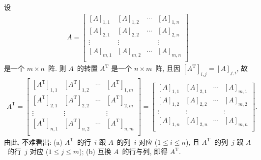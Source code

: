 \begin{example}
    设
    \begin{align*}
        A =
        \begin{bmatrix}
            [A]_{1,1} & [A]_{1,2} & \cdots & [A]_{1,n} \\
            [A]_{2,1} & [A]_{2,2} & \cdots & [A]_{2,n} \\
            \vdots    & \vdots    & {}     & \vdots    \\
            [A]_{m,1} & [A]_{m,2} & \cdots & [A]_{m,n} \\
        \end{bmatrix}
    \end{align*}
    是一个 \(m \times n\)~阵.
    则 \(A\)~的转置 \(A^{\mathrm{T}}\)
    是一个 \(n \times m\)~阵,
    且因 \([A^{\mathrm{T}}]_{i,j} = [A]_{j,i}\),
    故
    \begin{align*}
        A^{\mathrm{T}}
        =
        \begin{bmatrix}
            [A^{\mathrm{T}}]_{1,1} & [A^{\mathrm{T}}]_{1,2} &
            \cdots                 & [A^{\mathrm{T}}]_{1,m}   \\
            [A^{\mathrm{T}}]_{2,1} & [A^{\mathrm{T}}]_{2,2} &
            \cdots                 & [A^{\mathrm{T}}]_{2,m}   \\
            \vdots                 & \vdots                 &
            {}                     & \vdots                   \\
            [A^{\mathrm{T}}]_{n,1} & [A^{\mathrm{T}}]_{n,2} &
            \cdots                 & [A^{\mathrm{T}}]_{n,m}   \\
        \end{bmatrix}
        =
        \begin{bmatrix}
            [A]_{1,1} & [A]_{2,1} & \cdots & [A]_{m,1} \\
            [A]_{1,2} & [A]_{2,2} & \cdots & [A]_{m,2} \\
            \vdots    & \vdots    & {}     & \vdots    \\
            [A]_{1,n} & [A]_{2,n} & \cdots & [A]_{m,n} \\
        \end{bmatrix}.
    \end{align*}
    由此, 不难看出:
    (a)
    \(A^{\mathrm{T}}\)~的行~\(i\)
    跟 \(A\)~的列~\(i\) 对应
    (\(1 \leq i \leq n\)),
    且
    \(A^{\mathrm{T}}\)~的列~\(j\)
    跟 \(A\)~的行~\(j\) 对应
    (\(1 \leq j \leq m\));
    (b)
    互换 \(A\)~的行与列,
    即得 \(A^{\mathrm{T}}\).
\end{example}

